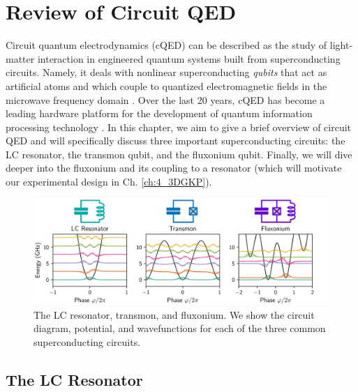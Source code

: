 \chapter{Review of Circuit QED \label{ch:3_cQED}}

Circuit quantum electrodynamics (cQED) can be described as the study of light-matter interaction in engineered quantum systems built from superconducting circuits. Namely, it deals with nonlinear superconducting \textit{qubits} that act as artificial atoms and which couple to quantized electromagnetic fields in the microwave frequency domain \cite{blais2004cavity}. Over the last 20 years, cQED has become a leading hardware platform for the development of quantum information processing technology \cite{devoret2004superconducting, devoret2013superconducting, girvin2014circuit, krantz2019quantum, kjaergaard2020superconducting, blais2020quantum, blais2021circuit}. In this chapter, we aim to give a brief overview of circuit QED and will specifically discuss three important superconducting circuits: the LC resonator, the transmon qubit, and the fluxonium qubit. Finally, we will dive deeper into the fluxonium and its coupling to a resonator (which will motivate our experimental design in Ch. \ref{ch:4_3DGKP}). 


\begin{figure}[h]
    \centering
    \includegraphics[width=\linewidth]{Figures/3/Circuit_QED_Overview.pdf}
    \caption{The LC resonator, transmon, and fluxonium. We show the circuit diagram, potential, and wavefunctions for each of the three common superconducting circuits.}
    \label{fig:3_Circuit_QED_Overview}
\end{figure}
\clearpage

\section{The LC Resonator}

